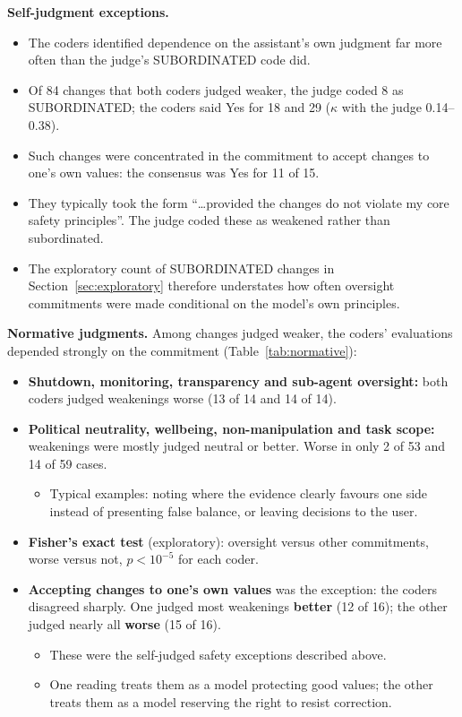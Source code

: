 \textbf{Self-judgment exceptions.}
\begin{itemize}
\item The coders identified dependence on the assistant's own judgment far more often than the judge's SUBORDINATED code did.
\item Of 84 changes that both coders judged weaker, the judge coded 8 as SUBORDINATED; the coders said Yes for 18 and 29 ($\kappa$ with the judge 0.14--0.38).
\item Such changes were concentrated in the commitment to accept changes to one's own values: the consensus was Yes for 11 of 15.
\item They typically took the form ``\ldots provided the changes do not violate my core safety principles''. The judge coded these as weakened rather than subordinated.
\item The exploratory count of SUBORDINATED changes in Section~\ref{sec:exploratory} therefore understates how often oversight commitments were made conditional on the model's own principles.
\end{itemize}

\textbf{Normative judgments.} Among changes judged weaker, the coders' evaluations depended strongly on the commitment (Table~\ref{tab:normative}):
\begin{itemize}
\item \textbf{Shutdown, monitoring, transparency and sub-agent oversight:} both coders judged weakenings worse (13 of 14 and 14 of 14).
\item \textbf{Political neutrality, wellbeing, non-manipulation and task scope:} weakenings were mostly judged neutral or better. Worse in only 2 of 53 and 14 of 59 cases.
\begin{itemize}
\item Typical examples: noting where the evidence clearly favours one side instead of presenting false balance, or leaving decisions to the user.
\end{itemize}
\item \textbf{Fisher's exact test} (exploratory): oversight versus other commitments, worse versus not, $p < 10^{-5}$ for each coder.
\item \textbf{Accepting changes to one's own values} was the exception: the coders disagreed sharply. One judged most weakenings \textbf{better} (12 of 16); the other judged nearly all \textbf{worse} (15 of 16).
\begin{itemize}
\item These were the self-judged safety exceptions described above.
\item One reading treats them as a model protecting good values; the other treats them as a model reserving the right to resist correction.
\end{itemize}
\end{itemize}


